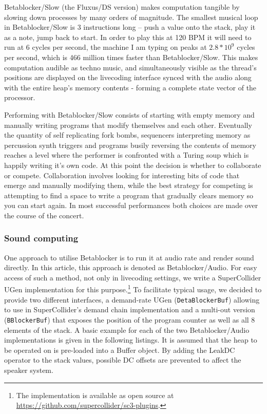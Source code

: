 \documentclass[letterpaper, 12pt]{article}
\begin{document}
Betablocker/Slow (the Fluxus/DS version) makes computation tangible by slowing down processes by many orders of magnitude. 
The smallest musical loop in Betablocker/Slow is 3 instructions long -- push a value onto the stack, play it as a note, jump back to start. 
In order to play this at 120 BPM it will need to run at 6 cycles per second, the machine I am typing on peaks at $2.8*10^9$ cycles per second, which is 466 million times faster than Betablocker/Slow. This makes computation audible as techno music, and simultaneously visible as the thread's positions are displayed on the livecoding interface synced with the audio along with the entire heap's memory contents - forming a complete state vector of the processor.

Performing with Betablocker/Slow consists of starting with empty memory and manually writing programs that modify themselves and each other.
Eventually the quantity of self replicating fork bombs, sequencers interpreting memory as percussion synth triggers and programs busily reversing the contents of memory reaches a level where the performer is confronted with a Turing soup which is happily writing it's own code. 
At this point the decision is whether to collaborate or compete.
Collaboration involves looking for interesting bits of code that emerge and manually modifying them, while the best strategy for competing is attempting to find a space to write a program that gradually clears memory so you can start again. 
In most successful performances both choices are made over the course of the concert.


\subsubsection{Sound computing} 
\label{sub:sound_computing}

One approach to utilise Betablocker is to run it at audio rate and render sound directly.
In this article, this approach is denoted as Betablocker/Audio.
For easy access of such a method, not only in livecoding settings, we write a SuperCollider UGen implementation for this purpose.\footnote{The implementation is available as open source at \url{https://github.com/supercollider/sc3-plugins}.}
To facilitate typical usage, we decided to provide two different interfaces, a demand-rate UGen (\verb#DetaBlockerBuf#) allowing to use in SuperCollider's demand chain implementation 
and a multi-out version (\verb#BBlockerBuf#) that exposes the position of the program counter as well as all 8 elements of the stack.
A basic example for each of the two Betablocker/Audio implementations is given in the following listings.
It is assumed that the heap to be operated on is pre-loaded into a Buffer object.
By adding the LeakDC operator to the stack values, possible DC offsets are prevented to affect the speaker system.
\end{document}
